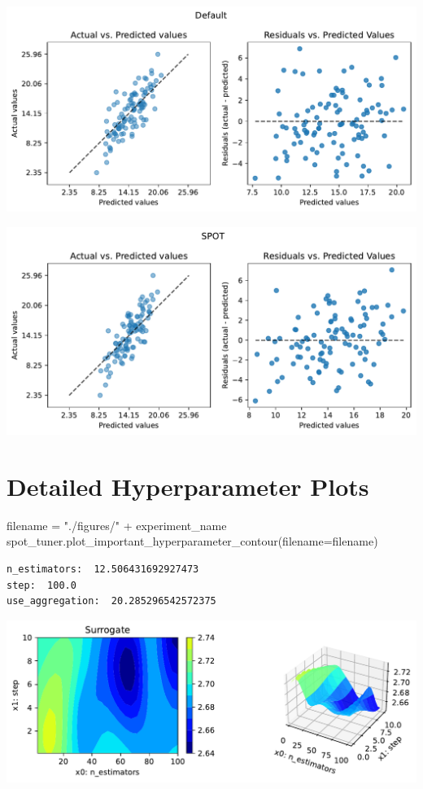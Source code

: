 \documentclass[
  letterpaper,
  DIV=11,
  numbers=noendperiod]{scrreprt}
\newenvironment{Shaded}{\begin{snugshade}}{\end{snugshade}}
\newcommand{\NormalTok}[1]{\textcolor[rgb]{0.00,0.23,0.31}{#1}}
\newcommand{\OperatorTok}[1]{\textcolor[rgb]{0.37,0.37,0.37}{#1}}
\newcommand{\StringTok}[1]{\textcolor[rgb]{0.13,0.47,0.30}{#1}}
\begin{document}
\includegraphics{025_spot_hpt_river_friedman_amfr_files/figure-pdf/cell-35-output-1.pdf}

\includegraphics{025_spot_hpt_river_friedman_amfr_files/figure-pdf/cell-35-output-2.pdf}

\section{Detailed Hyperparameter
Plots}\label{detailed-hyperparameter-plots-1}

\begin{Shaded}
\begin{Highlighting}[]
\NormalTok{filename }\OperatorTok{=} \StringTok{"./figures/"} \OperatorTok{+}\NormalTok{ experiment\_name}
\NormalTok{spot\_tuner.plot\_important\_hyperparameter\_contour(filename}\OperatorTok{=}\NormalTok{filename)}
\end{Highlighting}
\end{Shaded}

\begin{verbatim}
n_estimators:  12.506431692927473
step:  100.0
use_aggregation:  20.285296542572375
\end{verbatim}

\includegraphics{025_spot_hpt_river_friedman_amfr_files/figure-pdf/cell-36-output-2.pdf}
\end{document}
